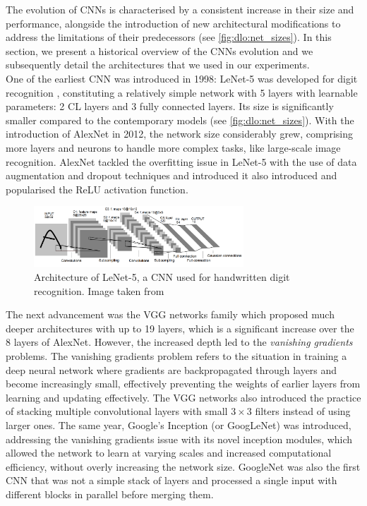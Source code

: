 The evolution of \aclp{CNN} is characterised by a consistent increase in their
size and performance, alongside the introduction of new architectural
modifications to address the limitations of their predecessors (see
\cref{fig:dlo:net_sizes}). In this section, we present a historical overview of
the \acp{CNN} evolution and we subsequently detail the architectures that we
used in our experiments.\\

One of the earliest \ac{CNN} was introduced in 1998: LeNet-5 was developed for
digit recognition \cite{DBLP:journals/pieee/LeCunBBH98}, constituting a
relatively simple network with 5 layers with learnable parameters: 2 \ac{CL}
layers and 3 fully connected layers. Its size is significantly smaller compared
to the contemporary models (see \cref{fig:dlo:net_sizes}). With the introduction
of AlexNet \cite{DBLP:conf/nips/KrizhevskySH12} in 2012, the network size
considerably grew, comprising more layers and neurons to handle more complex
tasks, like large-scale image recognition. AlexNet tackled the overfitting issue
in LeNet-5 with the use of data augmentation and dropout techniques and
introduced it also introduced and popularised the \ac{ReLU} activation
function.\\

\begin{figure}[htbp]
  \centering
  \includegraphics[width=0.70\textwidth]{chapter_sota/assets/lenet.png}
  \caption{Architecture of LeNet-5, a \acl{CNN} used for handwritten digit
    recognition. Image taken from \cite{DBLP:journals/pieee/LeCunBBH98}}
  \label{fig:dlo:lenet5}
\end{figure}


The next advancement was the VGG networks family
\cite{DBLP:journals/corr/SimonyanZ14a} %
which proposed much deeper architectures with up to 19 layers, which is a
significant increase over the 8 layers of AlexNet. However, the increased depth
led to the \emph{vanishing gradients} problems. The vanishing gradients problem
refers to the situation in training a deep neural network where gradients are
backpropagated through layers and become increasingly small, effectively
preventing the weights of earlier layers from learning and updating effectively.
The VGG networks also introduced the practice of stacking multiple convolutional
layers with small $3\times 3$ filters instead of using larger ones. The same
year, Google's Inception (or GoogLeNet) \cite{DBLP:conf/cvpr/SzegedyLJSRAEVR15}
was introduced, addressing the vanishing gradients  issue with its novel
inception modules, which allowed the network to learn at varying scales and
increased computational efficiency, without overly increasing the network size.
GoogleNet was also the first \ac{CNN} that was not a simple stack of layers and
processed a single input with different blocks in parallel before merging
them.\\

